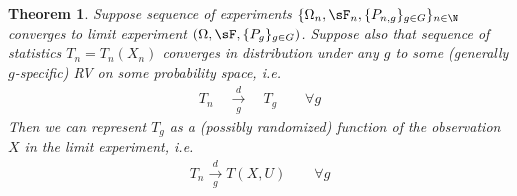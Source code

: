 \documentclass[12pt]{article}
\theoremstyle{plain}
\newtheorem{thm}{Theorem}[section]
\theoremstyle{definition}
\theoremstyle{remark}
\newtheorem*{rmk}{Remark}
\newcommand{\dto}{\xrightarrow{d}}
\begin{document}
\begin{thm}
\label{thm:limitexp}
Suppose sequence of experiments
$\{\Omega_n,\sF_n,\{P_{n,g}\}_{g\in G}\}_{n\in\N}$
converges to limit experiment
$(\Omega,\sF,\{P_{g}\}_{g\in G})$.
Suppose also that sequence of statistics $T_n=T_n(X_n)$ converges in
distribution under any $g$ to \emph{some} (generally $g$-specific) RV on
some probability space, i.e.
\begin{align*}
  T_n \quad\underset{g}{\dto}\quad T_g
  \qquad\forall g
\end{align*}
Then we can represent $T_g$ as a (possibly randomized) function of the
observation $X$ in the limit experiment, i.e.
\begin{align*}
  T_n \underset{g}{\dto} T(X,U)
  \qquad
  \forall g
\end{align*}
\end{thm}
\end{document}
